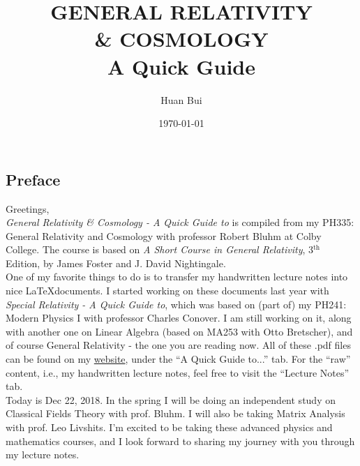 \documentclass{article}
\theoremstyle{definition}
\begin{document}
\begin{titlepage}\centering
 \clearpage
 \title{\textsc{\bf{GENERAL RELATIVITY\\ \& COSMOLOGY}}\\\smallskip A Quick Guide\\}
 \author{\bigskip Huan Bui}
 \date{\today}
 \maketitle
 \thispagestyle{empty}
\end{titlepage}

\subsection*{Preface}

Greetings,\\

\textit{General Relativity \& Cosmology - A Quick Guide to} is compiled from my PH335: General Relativity and Cosmology with professor Robert Bluhm at Colby College. The course is based on \textit{A Short Course in General Relativity}, 3$^{\text{th}}$ Edition, by James Foster and J. David Nightingale.\\

One of my favorite things to do is to transfer my handwritten lecture notes into nice \LaTeX documents. I started working on these documents last year with \textit{Special Relativity - A Quick Guide to}, which was based on (part of) my PH241: Modern Physics I with professor Charles Conover. I am still working on it, along with another one on Linear Algebra (based on MA253 with Otto Bretscher), and of course General Relativity - the one you are reading now. All of these .pdf files can be found on my \href{www.huanqbui.com}{website}, under the ``A Quick Guide to...'' tab. For the ``raw'' content, i.e., my handwritten lecture notes, feel free to visit the ``Lecture Notes'' tab.\\

Today is Dec 22, 2018. In the spring I will be doing an independent study on Classical Fields Theory with prof. Bluhm. I will also be taking Matrix Analysis with prof. Leo Livshits. I'm excited to be taking these advanced physics and mathematics courses, and I look forward to sharing my journey with you through my lecture notes.  \\
\end{document}
